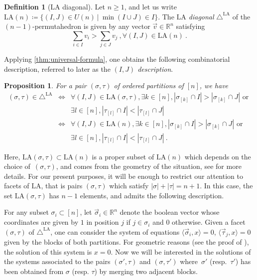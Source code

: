 \documentclass{amsart}
\newtheorem{proposition}[theorem]{Proposition}
\theoremstyle{definition}
\newtheorem{definition}[theorem]{Definition}
\newcommand{\R}{\mathbb{R}} %
\newcommand{\LA}{\mathrm{LA}}
\newcommand{\LAD}{\triangle^{\mathrm{LA}}}
\begin{document}
\begin{definition}[$\LA$ diagonal]
    Let $n\geq 1$, and let us write $\LA(n) \coloneqq \{(I,J) \in U(n) \ | \ \min(I\cup J)\in I \}$.
    The \emph{$\LA$ diagonal} $\LAD$ of the $(n-1)$-permutahedron is given by any vector $\vec v \in \R^n$ satisfying  
    \[\sum_{i \in I} v_i > \sum_{j \in J} v_j  \ , \forall (I,J) \in \LA(n) \ . \]
\end{definition}
Applying \cref{thm:universal-formula}, one obtains the following combinatorial description, referred to later as the \emph{$(I,J)$ description}. 
\begin{proposition}
\label{p:minimal}
For a pair $(\sigma,\tau)$ of ordered partitions of $[n]$, we have
\begin{eqnarray*}
    (\sigma,\tau)\in \LAD 
    & \iff & \forall (I,J) \in \LA(\sigma,\tau), \exists k \in [n] , 
    \left| \sigma_{[k]} \cap I \right|
    >
    \left| \sigma_{[k]} \cap J \right| \text{ or } \\
    && \exists l \in [n] , 
    \left| \tau_{[l]} \cap I \right|
    <
    \left| \tau_{[l]} \cap J \right|   \\
    & \iff & \forall (I,J) \in \LA(n), \exists k \in [n] , 
    \left| \sigma_{[k]} \cap I \right|
    >
    \left| \sigma_{[k]} \cap J \right| \text{ or } \\
    && \exists l \in [n] , 
    \left| \tau_{[l]} \cap I \right|
    <
    \left| \tau_{[l]} \cap J \right|  \ . 
\end{eqnarray*}
\end{proposition}
Here, $\LA(\sigma,\tau) \subset \LA(n)$ is a proper subset of $\LA(n)$ which depends on the choice of~$(\sigma,\tau)$, and comes from the geometry of the situation, see \cite[Theorem 1.26]{LA21} for more details.
For our present purposes, it will be enough to restrict our attention to facets of $\LA$, that is pairs $(\sigma,\tau)$ which satisfy $|\sigma| + |\tau|=n+1$.
In this case, the set $\LA(\sigma,\tau)$ has $n-1$ elements, and admits the following description. 

For any subset $\sigma_i \subset [n]$, let $\vec \sigma_i \in \R^n$ denote the boolean vector whose coordinates are given by $1$ in position $j$ if $j \in \sigma_i$ and $0$ otherwise. 
Given a facet $(\sigma,\tau)$ of $\LAD$, one can consider the system of equations $\langle \vec \sigma_i , x \rangle=0$, $\langle \vec \tau_j , x \rangle=0$ given by the blocks of both partitions.
For geometric reasons (see the proof of \cite[Theorem 1.26]{LA21}), the solution of this system is $x=0$. 
Now we will be interested in the solutions of the systems associated to the pairs $(\sigma',\tau)$ and $(\sigma,\tau')$ where~$\sigma'$ (resp.~$\tau'$) has been obtained from $\sigma$ (resp. $\tau$) by merging two adjacent blocks.
\end{document}
